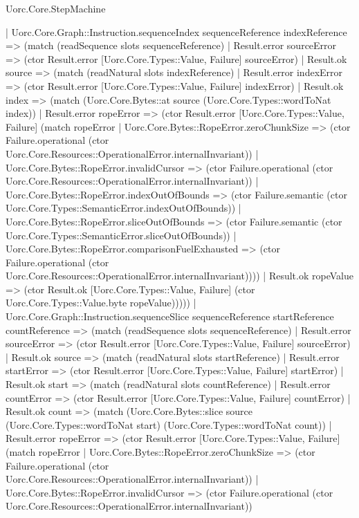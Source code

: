 \begin{lexlean}{Uorc.Core.StepMachine}
\begin{semanticmodule}
{    | Uorc.Core.Graph::Instruction.sequenceIndex sequenceReference indexReference => (match (readSequence slots sequenceReference)
      | Result.error sourceError => (ctor Result.error [Uorc.Core.Types::Value, Failure] sourceError)
      | Result.ok source => (match (readNatural slots indexReference)
        | Result.error indexError => (ctor Result.error [Uorc.Core.Types::Value, Failure] indexError)
        | Result.ok index => (match (Uorc.Core.Bytes::at source (Uorc.Core.Types::wordToNat index))
          | Result.error ropeError => (ctor Result.error [Uorc.Core.Types::Value, Failure] (match ropeError
            | Uorc.Core.Bytes::RopeError.zeroChunkSize => (ctor Failure.operational (ctor Uorc.Core.Resources::OperationalError.internalInvariant))
            | Uorc.Core.Bytes::RopeError.invalidCursor => (ctor Failure.operational (ctor Uorc.Core.Resources::OperationalError.internalInvariant))
            | Uorc.Core.Bytes::RopeError.indexOutOfBounds => (ctor Failure.semantic (ctor Uorc.Core.Types::SemanticError.indexOutOfBounds))
            | Uorc.Core.Bytes::RopeError.sliceOutOfBounds => (ctor Failure.semantic (ctor Uorc.Core.Types::SemanticError.sliceOutOfBounds))
            | Uorc.Core.Bytes::RopeError.comparisonFuelExhausted => (ctor Failure.operational (ctor Uorc.Core.Resources::OperationalError.internalInvariant))))
          | Result.ok ropeValue => (ctor Result.ok [Uorc.Core.Types::Value, Failure] (ctor Uorc.Core.Types::Value.byte ropeValue)))))
    | Uorc.Core.Graph::Instruction.sequenceSlice sequenceReference startReference countReference => (match (readSequence slots sequenceReference)
      | Result.error sourceError => (ctor Result.error [Uorc.Core.Types::Value, Failure] sourceError)
      | Result.ok source => (match (readNatural slots startReference)
        | Result.error startError => (ctor Result.error [Uorc.Core.Types::Value, Failure] startError)
        | Result.ok start => (match (readNatural slots countReference)
          | Result.error countError => (ctor Result.error [Uorc.Core.Types::Value, Failure] countError)
          | Result.ok count => (match (Uorc.Core.Bytes::slice source (Uorc.Core.Types::wordToNat start) (Uorc.Core.Types::wordToNat count))
            | Result.error ropeError => (ctor Result.error [Uorc.Core.Types::Value, Failure] (match ropeError
              | Uorc.Core.Bytes::RopeError.zeroChunkSize => (ctor Failure.operational (ctor Uorc.Core.Resources::OperationalError.internalInvariant))
              | Uorc.Core.Bytes::RopeError.invalidCursor => (ctor Failure.operational (ctor Uorc.Core.Resources::OperationalError.internalInvariant))
}
\end{semanticmodule}
\end{lexlean}
